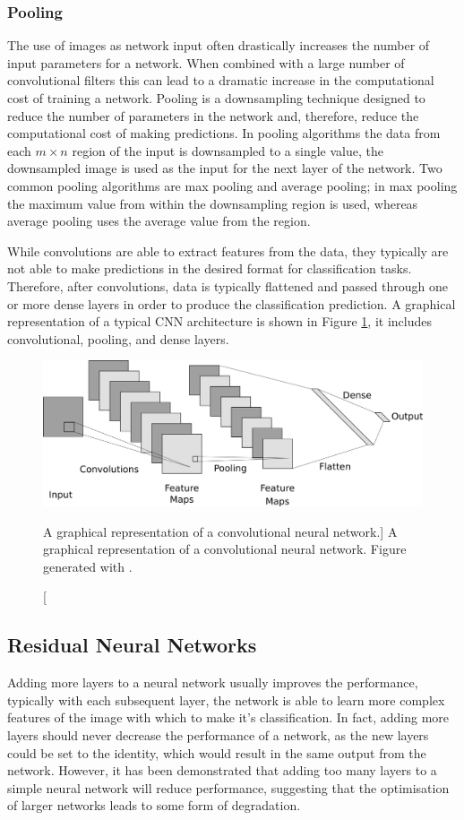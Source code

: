 \subsubsection*{Pooling}
The use of images as network input often drastically increases the number of
input parameters for a network. When combined with a large number of
convolutional filters this can lead to a dramatic increase in the computational
cost of training a network. Pooling\cite{5537907} is a downsampling technique 
designed to reduce the number of parameters in the network and, therefore, 
reduce the computational cost of making predictions. In pooling algorithms
the data from each $m \times n$ region of the input is downsampled to a single 
value, the downsampled image is used as the input for the next layer of the 
network. Two common pooling algorithms are max pooling and average pooling; in 
max pooling the maximum value from within the downsampling region is used, 
whereas average pooling uses the average value from the region.

\bigskip\noindent
While convolutions are able to extract features from the data, they typically
are not able to make predictions in the desired format for classification tasks.
Therefore, after convolutions, data is typically flattened and passed through
one or more dense layers in order to produce the classification prediction. A
graphical representation of a typical CNN architecture is shown in Figure
\ref{fig:cnn_layer}, it includes convolutional, pooling, and dense layers.
\begin{figure}
	\centering
	\includegraphics[width = \textwidth]{figures/cnn_layer.png}
	\caption
	[A graphical representation of a convolutional neural network.]
	{ A graphical representation of a convolutional neural network. Figure
	generated with \cite{cnn_diagrams}.}
	\label{fig:cnn_layer}
\end{figure}

\subsection{Residual Neural Networks}
Adding more layers to a neural network usually improves the performance,
typically with each subsequent layer, the network is able to learn more complex 
features of the image with which to make it's classification. In fact, adding 
more layers should never decrease the performance of a network, as the new 
layers could be set to the identity, which would result in the same output 
from the network. However, it has been demonstrated that adding too many 
layers to a simple neural network will reduce performance, suggesting that the 
optimisation of larger networks leads to some form of 
degradation\cite{He_2016_CVPR}.

